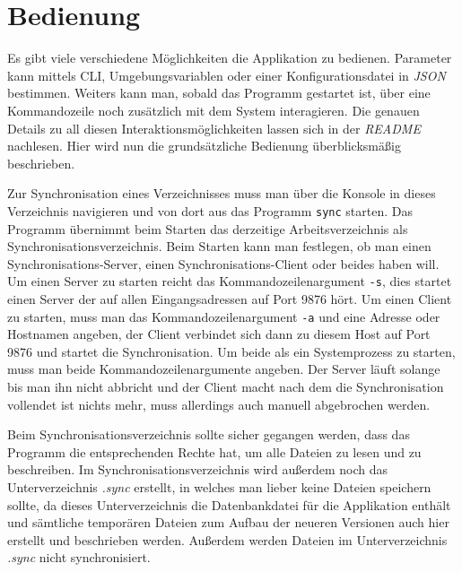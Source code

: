 \section{Bedienung}

Es gibt viele verschiedene Möglichkeiten die Applikation zu bedienen. Parameter kann mittels CLI, Umgebungsvariablen oder einer Konfigurationsdatei in \textsl{JSON} bestimmen.
Weiters kann man, sobald das Programm gestartet ist, über eine Kommandozeile noch zusätzlich mit dem System interagieren. Die genauen Details zu all diesen Interaktionsmöglichkeiten
lassen sich in der \textit{README} nachlesen. Hier wird nun die grundsätzliche Bedienung überblicksmäßig beschrieben.

Zur Synchronisation eines Verzeichnisses muss man über die Konsole in dieses Verzeichnis navigieren und von dort aus das Programm \verb|sync| starten. Das Programm übernimmt
beim Starten das derzeitige Arbeitsverzeichnis als Synchronisationsverzeichnis. Beim Starten kann man festlegen, ob man einen Synchronisations-Server, einen Synchronisations-Client 
oder beides haben will. Um einen Server zu starten reicht das Kommandozeilenargument \verb|-s|, dies startet einen Server der auf allen Eingangsadressen auf Port 9876 hört.
Um einen Client zu starten, muss man das Kommandozeilenargument \verb|-a| und eine Adresse oder Hostnamen angeben, der Client verbindet sich dann zu diesem Host auf Port 9876 und 
startet die Synchronisation. Um beide als ein Systemprozess zu starten, muss man beide Kommandozeilenargumente angeben. Der Server läuft solange bis man ihn nicht abbricht
und der Client macht nach dem die Synchronisation vollendet ist nichts mehr, muss allerdings auch manuell abgebrochen werden.

Beim Synchronisationsverzeichnis sollte sicher gegangen werden, dass das Programm die entsprechenden Rechte hat, um alle Dateien zu lesen und zu beschreiben.
Im Synchronisationsverzeichnis wird außerdem noch das Unterverzeichnis \textit{.sync} erstellt, in welches man lieber keine Dateien speichern sollte, da dieses Unterverzeichnis 
die Datenbankdatei für die Applikation enthält und sämtliche temporären Dateien zum Aufbau der neueren Versionen auch hier erstellt und beschrieben werden. Außerdem werden Dateien
im Unterverzeichnis \textit{.sync} nicht synchronisiert.

